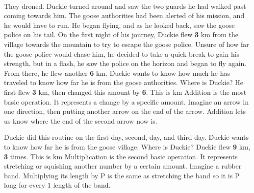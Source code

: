 \documentclass[a4paper,11pt ]{book}
\begin{document}
\paragraph{} They droned. Duckie turned around and saw the two guards he had walked past coming towards him. The goose authorities had been alerted of his mission, and he would have to run. He began flying, and as he looked back, saw the goose police on his tail. 
\vfill
\pagebreak
{On the first night of his journey, Duckie flew \textbf{3} km from the village towards the mountain to try to escape the goose police. Unsure of how far the goose police would chase him, he decided to take a quick break to gain his strength, but in a flash, he saw the police on the horizon and began to fly again. From there, he flew another \textbf{6} km. Duckie wants to know how much he has traveled to know how far he is from the goose authorities. Where is Duckie?}
{He first flew \textbf{3} km, then changed this amount by \textbf{6}. This is  km}
{Addition is the most basic operation. It represents a change by a specific amount. Imagine an arrow in one direction, then putting another arrow on the end of the arrow. Addition lets us know where the end of the second arrow now is.}
{}
{Duckie did this routine on the first day, second, day, and third day.  Duckie wants to know how far he is from the goose village. Where is Duckie?}
{Duckie flew \textbf{9} km, \textbf{3} times. This is  km}
{Multiplication is the second basic operation. It represents stretching or squishing another number by a certain amount. Imagine a rubber band. Multiplying its length by P is the same as stretching the band so it is P long for every 1 length of the band.}
\end{document}
